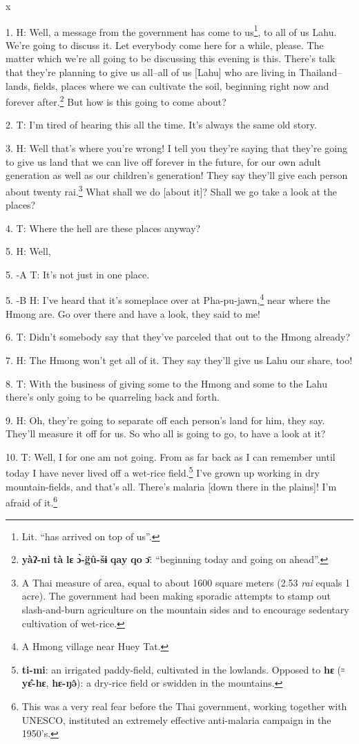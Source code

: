 x\setcounter{footnote}{0}

1. H: Well, a message from the government has come to us\footnote{Lit. ``has arrived on top of us''.}, to all of us Lahu.
We're going to discuss it. Let everybody come here for a while, please. The matter
which we're all going to be discussing this evening is this. There's talk that
they're planning to give us all--all of us [Lahu] who are living in Thailand--lands,
fields, places where we can cultivate the soil, beginning right now and forever
after.\footnote{\textbf{yàʔ-ni} \textbf{tà} \textbf{lɛ} \textbf{ɔ̀-g̈û-šɨ} \textbf{qay} \textbf{qo} \textbf{ɔ̄}: ``beginning today and going on ahead''.} But how is this going to come about?

2. T: I'm tired of hearing this all the time. It's always the same old story.

3. H: Well that's where you're wrong! I tell you they're saying that they're going
to give us land that we can live off forever in the future, for our own adult generation
as well as our children's generation! They say they'll give each person about twenty
rai.\footnote{A Thai measure of area, equal to about 1600 square meters (2.53 \textit{rai } equals 1 acre). The government had been making sporadic attempts to stamp out slash-and-burn agriculture on the mountain sides and to encourage sedentary cultivation of wet-rice.} What shall we do [about it]? Shall we go take a look at the places?

4. T: Where the hell are these places anyway?

5. H: Well,

5. -A T: It's not just in one place.

5. -B H: I've heard that it's someplace over at Pha-pu-jawn,\footnote{A Hmong village near Huey Tat.} near where the Hmong
are. Go over there and have a look, they said to me!

6. T: Didn't somebody say that they've parceled that out to the Hmong already?

7. H: The Hmong won't get all of it. They say they'll give us Lahu our share, too!

8. T: With the business of giving some to the Hmong and some to the Lahu there's
only going to be quarreling back and forth.

9. H: Oh, they're going to separate off each person's land for him, they say. They'll
measure it off for us. So who all is going to go, to have a look at it?

10. T: Well, I for one am not going. From as far back as I can remember until
today I have never lived off a wet-rice field.\footnote{\textbf{ti-mi}: an irrigated paddy-field, cultivated in the lowlands. Opposed to \textbf{hɛ} (꞊ \textbf{yɛ̂-hɛ}, \textbf{hɛ-ŋə̂}): a dry-rice field or swidden in the mountains.} I've grown up working in dry
mountain-fields, and that's all. There's malaria [down there in the plains]! I'm
afraid of it.\footnote{This was a very real fear before the Thai government, working together with UNESCO, instituted an extremely effective anti-malaria campaign in the 1950's.}


